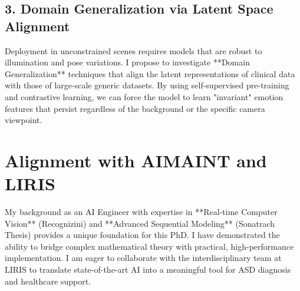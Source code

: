 \documentclass[11pt,a4paper]{article}
\begin{document}
\subsection{3. Domain Generalization via Latent Space Alignment}
Deployment in unconstrained scenes requires models that are robust to illumination and pose variations. I propose to investigate **Domain Generalization** techniques that align the latent representations of clinical data with those of large-scale generic datasets. By using self-supervised pre-training and contrastive learning, we can force the model to learn "invariant" emotion features that persist regardless of the background or the specific camera viewpoint.

\section{Alignment with AIMAINT and LIRIS}
My background as an AI Engineer with expertise in **Real-time Computer Vision** (Recognizini) and **Advanced Sequential Modeling** (Sonatrach Thesis) provides a unique foundation for this PhD. I have demonstrated the ability to bridge complex mathematical theory with practical, high-performance implementation. I am eager to collaborate with the interdisciplinary team at LIRIS to translate state-of-the-art AI into a meaningful tool for ASD diagnosis and healthcare support.
\end{document}
